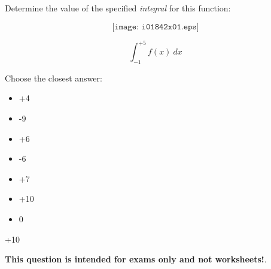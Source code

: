 

Determine the value of the specified {\it integral} for this function:

$$\texttt{[image: i01842x01.eps]}$$

$$\int_{-1}^{+5} f(x) \> dx$$

Choose the closest answer:

\begin{itemize}
\item{} +4
\vskip 10pt 
\item{} -9
\vskip 10pt 
\item{} +6
\vskip 10pt 
\item{} -6
\vskip 10pt 
\item{} +7
\vskip 10pt 
\item{} +10
\vskip 10pt 
\item{} 0
\end{itemize}








+10






{\bf This question is intended for exams only and not worksheets!}.



